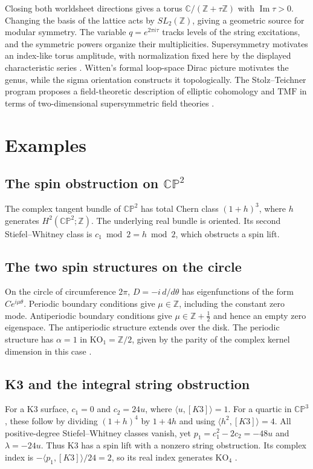 \documentclass[11pt]{article}
\theoremstyle{definition}
\newcommand{\KO}{\mathrm{KO}}
\newcommand{\Z}{\mathbb Z}
\begin{document}
Closing both worldsheet directions gives a torus \(\mathbb C/(\Z+\tau\Z)\) with \(\operatorname{Im}\tau>0\). Changing the basis of the lattice acts by \(SL_2(\Z)\), giving a geometric source for modular symmetry. The variable \(q=e^{2\pi i\tau}\) tracks levels of the string excitations, and the symmetric powers organize their multiplicities. Supersymmetry motivates an index-like torus amplitude, with normalization fixed here by the displayed characteristic series \cite{Wl,We,TYK}. Witten's formal loop-space Dirac picture motivates the genus, while the sigma orientation constructs it topologically. The Stolz--Teichner program proposes a field-theoretic description of elliptic cohomology and \(\mathrm{TMF}\) in terms of two-dimensional supersymmetric field theories \cite{ST,BE}.

\section{Examples}
\subsection{The spin obstruction on \texorpdfstring{\(\mathbb{CP}^2\)}{the complex projective plane}}
The complex tangent bundle of \(\mathbb{CP}^2\) has total Chern class \((1+h)^3\), where \(h\) generates \(H^2(\mathbb{CP}^2;\Z)\). The underlying real bundle is oriented. Its second Stiefel--Whitney class is \(c_1\bmod2=h\bmod2\), which obstructs a spin lift.

\subsection{The two spin structures on the circle}
On the circle of circumference \(2\pi\), \(D=-i\,d/d\theta\) has eigenfunctions of the form \(Ce^{i\mu\theta}\). Periodic boundary conditions give \(\mu\in\Z\), including the constant zero mode. Antiperiodic boundary conditions give \(\mu\in\Z+\tfrac12\) and hence an empty zero eigenspace. The antiperiodic structure extends over the disk. The periodic structure has \(\alpha=1\) in \(\KO_1=\Z/2\), given by the parity of the complex kernel dimension in this case \cite[Appendix A]{TYK}.

\subsection{K3 and the integral string obstruction}
For a K3 surface, \(c_1=0\) and \(c_2=24u\), where \(\langle u,[K3]\rangle=1\). For a quartic in \(\mathbb{CP}^3\), these follow by dividing \((1+h)^4\) by \(1+4h\) and using \(\langle h^2,[K3]\rangle=4\). All positive-degree Stiefel--Whitney classes vanish, yet \(p_1=c_1^2-2c_2=-48u\) and \(\lambda=-24u\). Thus K3 has a spin lift with a nonzero string obstruction. Its complex index is \(-\langle p_1,[K3]\rangle/24=2\), so its real index generates \(\KO_4\) \cite{FH}.
\end{document}
